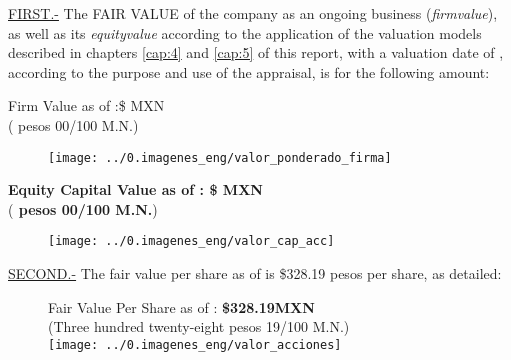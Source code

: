 \textcolor{principal}{\underline{FIRST.-}}  The \textcolor{principal}{FAIR VALUE} of the company \textcolor{principal}{\empresaSolicitante}  as an ongoing business (\textit{\gls{firmvalue}}), as well as its \textit{\gls{equityvalue}} according to the application of the valuation models described in chapters \ref{cap:4} and \ref{cap:5} of this report, with a valuation date of \fechaValores, according to the purpose and use of the appraisal, is for the following amount:\\


\begin{center}
\textcolor{principal}{Firm Value as of \fechaValoresCorto:}\$\valorFirma{} MXN\\

(\textcolor{secundario}{\valorFirmaLetra{} pesos 00/100 M.N.})

\begin{figure}[H]
\centering
\texttt{[image: ../0.imagenes\_eng/valor\_ponderado\_firma]}
\end{figure}


\textbf{\textcolor{principal}{Equity Capital Value as of \fechaValoresCorto:} \$\valorCapital{} MXN}\\
(\textbf{\textcolor{secundario}{\valorCapitalLetra{} pesos 00/100 M.N.}})\\
\end{center}

\begin{figure}[H]
\centering
 \texttt{[image: ../0.imagenes\_eng/valor\_cap\_acc]}

\end{figure}
\espacio{.5cm}


\textcolor{principal}{\underline{SECOND.-}} The fair value per share as of \textcolor{principal}{\fechaValoresCorto}  is \$328.19 pesos per share, as detailed:
\begin{figure}[H]
\centering

\textcolor{principal}{Fair Value Per Share as of \fechaValoresCorto:} \textbf{\$328.19MXN}\\[5pt]
(\textcolor{secundario}{Three hundred twenty-eight pesos 19/100 M.N.})\\[10pt]

 \texttt{[image: ../0.imagenes\_eng/valor\_acciones]}

\end{figure}


\vspace{2cm}